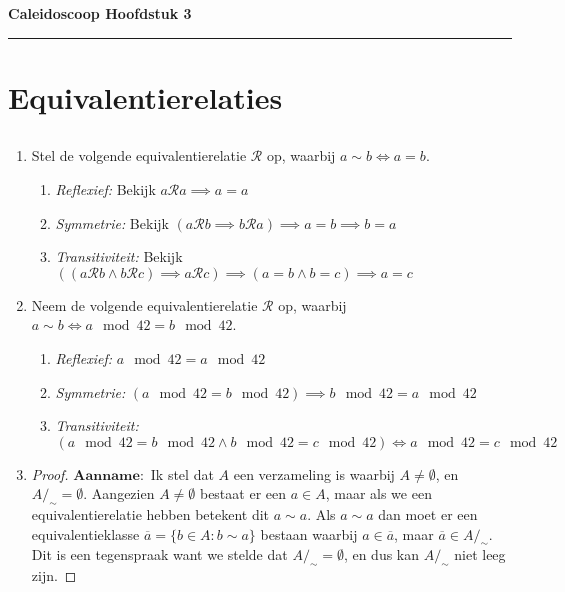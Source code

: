 \documentclass{article}
\begin{document}
\begin{center}
    \Large \textbf{Caleidoscoop Hoofdstuk 3}
\end{center}

\rule{\textwidth}{2pt}

\bigskip

\section{Equivalentierelaties}

\subsection{}
\begin{enumerate}[label=\alph*)]
    \item 
        Stel de volgende equivalentierelatie $\mathcal{R}$ op, waarbij $a \sim b \Longleftrightarrow a = b$.
        \begin{enumerate}[label=\arabic*]
            \item \emph{Reflexief:} Bekijk $a \mathcal{R} a \implies a = a$
            \item \emph{Symmetrie:} Bekijk $(a \mathcal{R} b \implies b \mathcal{R} a) \implies a = b \implies b = a$ 
            \item \emph{Transitiviteit:} Bekijk $((a \mathcal{R} b \wedge b \mathcal{R} c) \implies a \mathcal{R}c) \implies (a = b \wedge b = c) \implies a = c$
        \end{enumerate}
    \item
        Neem de volgende equivalentierelatie $\mathcal{R}$ op, waarbij $a \sim b \Longleftrightarrow a \mod 42 = b \mod 42$.
        \begin{enumerate}[label=\arabic*]
            \item \emph{Reflexief:} $a \mod 42 = a \mod 42$
            \item \emph{Symmetrie:} $(a \mod 42 = b \mod 42) \implies b \mod 42 = a \mod 42$ 
            \item \emph{Transitiviteit:} $(a \mod 42 = b \mod 42 \wedge b \mod 42 = c \mod 42) \Longleftrightarrow a \mod 42 = c \mod 42$
        \end{enumerate}
    \item 
    \begin{proof}
        $\mathbf{Aanname:}$ Ik stel dat $A$ een verzameling is waarbij $A \neq \emptyset$, en $A/_\sim = \emptyset$. 
        Aangezien $A \neq \emptyset$ bestaat er een $a \in A$, maar als we een equivalentierelatie hebben betekent dit $a \sim a$.
        Als $a \sim a$ dan moet er een equivalentieklasse $\overline{a} = \{b \in A : b \sim a\}$ bestaan waarbij $a \in \overline{a}$, maar $\overline{a} \in A/_\sim$. 
        Dit is een tegenspraak want we stelde dat $A/_\sim = \emptyset$, en dus kan $A/_\sim$ niet leeg zijn.
    \end{proof}
\end{enumerate}
\end{document}
